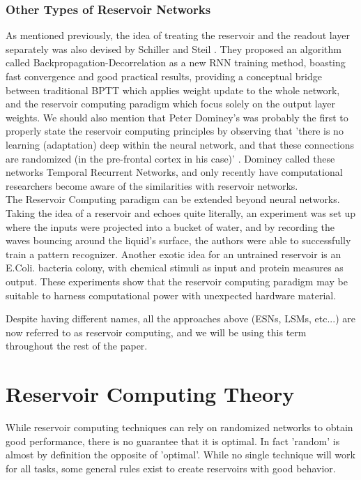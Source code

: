 \documentclass[12pt,oneside]{CUNY_CS_PhD}
\begin{document}
\subsubsection{Other Types of Reservoir Networks}
As mentioned previously, the idea of treating the reservoir and the readout layer separately was also devised by Schiller and Steil \cite{steil2004backpropagation}. They proposed an algorithm called Backpropagation-Decorrelation as a new RNN training method, boasting fast convergence and good practical results, providing a conceptual bridge between traditional BPTT which applies weight update to the whole network, and the reservoir computing paradigm which focus solely on the output layer weights.
We should also mention that Peter Dominey's was probably the first to properly state the reservoir computing principles by observing that 'there is no learning (adaptation) deep within the neural network, and that these connections are randomized (in the pre-frontal cortex in his case)' \cite{DomineyRamus00}. Dominey called these networks Temporal Recurrent Networks, and only recently have computational researchers become aware of the similarities with reservoir networks.\\
The Reservoir Computing paradigm can be extended beyond neural networks. Taking the idea of a reservoir and echoes quite literally, an experiment was set up where the inputs were projected into a bucket of water, and by recording the waves bouncing around the liquid's surface, the authors were able to successfully train a pattern recognizer. Another exotic idea for an untrained reservoir is an E.Coli. bacteria colony, with chemical stimuli as input and protein measures as output. These experiments show that the reservoir computing paradigm may be suitable to harness computational power with unexpected hardware material.

Despite having different names, all the approaches above (ESNs, LSMs, etc...) are now referred to as reservoir computing, and we will be using this term throughout the rest of the paper.

\section{Reservoir Computing Theory}
\label{theory} 
While reservoir computing techniques can rely on randomized networks to obtain good performance, there is no guarantee that it is optimal. In fact 'random' is almost by definition the opposite of 'optimal'. While no single technique will work for all tasks, some general rules exist to create reservoirs with good behavior.
\end{document}
